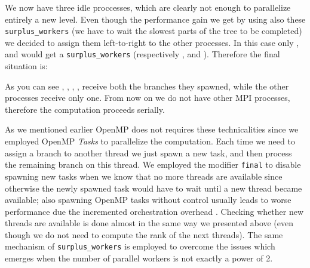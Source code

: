 \documentclass{article}
\begin{document}
We now have three idle proccesses, which are clearly not enough to parallelize
entirely a new level. Even though the performance gain we get by using also
these \texttt{surplus\_workers} (we have to wait the slowest parts of the
tree to be completed) we decided to assign them left-to-right to the other
processes. In this case only ,  and  would get a
\texttt{surplus\_workers} (respectively ,  and ).
Therefore the final situation is:

\begin{figure}[H]
    \centering
\end{figure}

As you can see , , , ,  receive both the
branches they spawned, while the other processes receive only one. From now on
we do not have other MPI processes, therefore the computation proceeds serially.

As we mentioned earlier OpenMP does not requires these technicalities since we
employed OpenMP \emph{Tasks} to parallelize the computation. Each time we need
to assign a branch to another thread we just spawn a new task, and then process
the remaining branch on this thread. We employed the modifier \texttt{final}
to disable spawning new tasks when we know that no more threads are available
since otherwise the newly spawned task would have to wait until a new thread
became available; also spawning OpenMP tasks without control usually leads to
worse performance due the incremented orchestration overhead
\cite{hager2010introduction}. Checking whether new threads are available is done
almost in the same way we presented above (even though we do not need to compute
the rank of the next threads). The same mechanism of \texttt{surplus\_workers}
is employed to overcome the issues which emerges when the number of parallel
workers is not exactly a power of 2.
\end{document}
